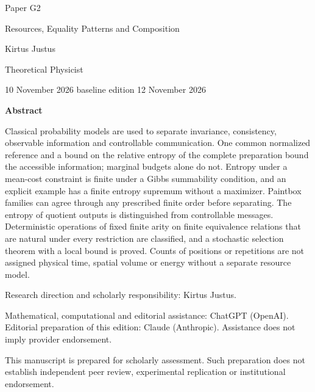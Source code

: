 \documentclass[11pt,a4paper]{article}
\begin{document}
\begin{titlepage}
{\small\sffamily \ProgramTitle\hfill Paper G2\par}
\vspace*{16mm}
{\LARGE\bfseries\raggedright{} Resources, Equality Patterns and Composition\par}
\vspace{11mm}
{\large Kirtus Justus\par}
\vspace{1mm}
Theoretical Physicist\par
\AuthorLocation\par
\vspace{2mm}
10 November 2026 \textperiodcentered{} baseline edition 12 November 2026\par
\vspace{11mm}
\textbf{Abstract}\par
Classical probability models are used to separate invariance, consistency, observable information and controllable communication. One common normalized reference and a bound on the relative entropy of the complete preparation bound the accessible information; marginal budgets alone do not. Entropy under a mean-cost constraint is finite under a Gibbs summability condition, and an explicit example has a finite entropy supremum without a maximizer. Paintbox families can agree through any prescribed finite order before separating. The entropy of quotient outputs is distinguished from controllable messages. Deterministic operations of fixed finite arity on finite equivalence relations that are natural under every restriction are classified, and a stochastic selection theorem with a local bound is proved. Counts of positions or repetitions are not assigned physical time, spatial volume or energy without a separate resource model.\par
\vfill
{\small Research direction and scholarly responsibility: Kirtus Justus.\par
Mathematical, computational and editorial assistance: ChatGPT (OpenAI). Editorial preparation of this edition: Claude (Anthropic).
Assistance does not imply provider endorsement.\par
This manuscript is prepared for scholarly assessment. Such preparation does not establish independent peer review,
experimental replication or institutional endorsement.\par}
\end{titlepage}
\setcounter{page}{2}
\setcounter{section}{2}

\clearpage
\end{document}
